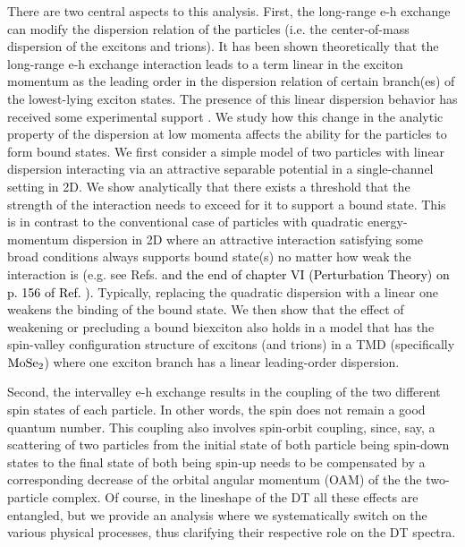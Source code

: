 \documentclass[aps,prb,superscriptaddress,letterpaper,amsmath,amssymb,twocolumn,preprintnumbers]{revtex4}
\newcommand\revisionA[1]{\textcolor{black}{#1}}
\begin{document}
There are two central aspects to this analysis. First, the long-range e-h exchange can modify the dispersion relation of the particles (i.e. the center-of-mass dispersion of the excitons and trions).
%
It has been shown theoretically  \cite{wu-etal.15prb,qiu-etal.15,steinhoff-etal.2018,deilmann-thygesen.19,sauer-etal.2021} that the long-range e-h exchange interaction leads to a term linear in the exciton momentum as the leading order in the dispersion relation of certain branch(es) of the lowest-lying exciton states. The presence of this linear dispersion behavior has received some experimental support \cite{schneider-etal.2019,hong-etal.2020}.
%
We study how this change in the analytic property of the dispersion at low momenta affects the ability for the particles to form bound states.
%
We first consider a simple model of two particles with linear dispersion interacting via an attractive separable potential in a single-channel setting in 2D. We show analytically that there exists a threshold that the strength of the interaction needs to exceed for it to support a bound state. This is in contrast to the conventional case of particles with quadratic energy-momentum dispersion in 2D where an attractive interaction satisfying some broad conditions always supports bound state(s) no matter how weak the interaction is (e.g. see Refs. 
%
%
\revisionA{
and the end of chapter VI (Perturbation Theory) on p. 156 of Ref. \onlinecite{landau-lifshitz.58}).
}
%
%
Typically, replacing the quadratic dispersion with a linear one weakens the binding of the bound state. We then show that the effect of weakening or precluding a bound biexciton also holds in a model that has the spin-valley configuration structure of excitons (and trions) in a TMD (specifically ${\rm MoSe}_2$) where one exciton branch has a linear leading-order dispersion.

Second, the intervalley e-h exchange results in the coupling of the two different spin states of each particle. In other words, the spin does not remain a good quantum number. This coupling also involves spin-orbit coupling,  since, say, a scattering of two particles from the initial state of both particle being spin-down states to the final state of both being spin-up needs to be compensated by a corresponding decrease of the orbital angular momentum (OAM) of the the two-particle complex. Of course, in the lineshape of the DT all these effects are entangled, but we provide an analysis where we systematically switch on the various physical processes, thus clarifying their respective role on the DT spectra.
\end{document}
